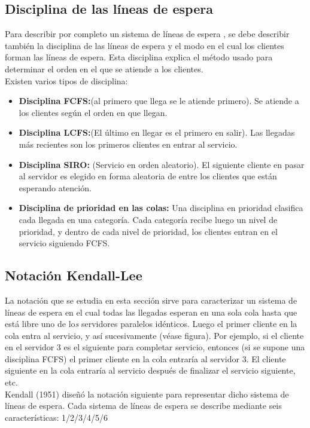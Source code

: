 \subsection{Disciplina de las líneas de espera}
Para describir por completo un sistema de líneas de espera , se debe describir también la disciplina de las líneas de espera y el modo en el cual los clientes forman las líneas de espera. Esta disciplina explica el método usado para determinar el orden en el que se atiende a los clientes.
\\ Existen varios tipos de disciplina:
\begin{itemize}
	\item \textbf{Disciplina FCFS:}(al primero que llega se le atiende primero). Se atiende a los clientes según el orden en que llegan.
	\item\textbf{Disciplina LCFS:}(El último en llegar es el primero en salir). Las llegadas más recientes son los primeros clientes en entrar al servicio.
	\item\textbf{Disciplina SIRO:} (Servicio en orden aleatorio). El siguiente cliente en pasar al servidor es elegido en forma aleatoria de entre los clientes que están esperando atención.
	\item\textbf{Disciplina de prioridad en las colas:} Una disciplina en prioridad clasifica cada llegada en una categoría. Cada categoría recibe luego un nivel de prioridad, y dentro de cada nivel de prioridad, los clientes entran en el servicio siguiendo FCFS.
	
\end{itemize}

\subsection{Notación Kendall-Lee}
La notación que se estudia en esta sección sirve para caracterizar un sistema de líneas de espera en el cual todas las llegadas esperan en una sola cola hasta que está libre uno de lo\textit{s} servidores paralelos idénticos. Luego el primer cliente en la cola  entra al servicio, y así sucesivamente (véase figura). Por ejemplo, si el cliente en el servidor 3 es el siguiente para completar servicio, entonces (si se supone una disciplina FCFS) el primer cliente en la cola entraría al servidor 3. El cliente siguiente en la cola entraría al servicio después de finalizar el servicio siguiente, etc.
\\
Kendall (1951) diseñó la notación siguiente para representar dicho sistema de líneas de espera. Cada sistema de líneas de espera se describe mediante seis características:
1/2/3/4/5/6

